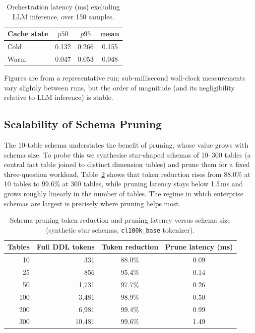 \documentclass[runningheads]{llncs}
\begin{document}
\begin{table}[htbp]
\centering
\caption{Orchestration latency (ms) excluding LLM inference, over 150 samples.}
\label{tab:latency}
\begin{tabular}{lccc}
\toprule
\textbf{Cache state} & \textbf{$p50$} & \textbf{$p95$} & \textbf{mean} \\
\midrule
Cold & 0.132 & 0.266 & 0.155 \\
Warm & 0.047 & 0.053 & 0.048 \\
\bottomrule
\end{tabular}
\par\smallskip
\raggedright\small Figures are from a representative run; sub-millisecond wall-clock measurements vary slightly between runs, but the order of magnitude (and its negligibility relative to LLM inference) is stable.
\end{table}

\subsection{Scalability of Schema Pruning}
\label{sec:scale}
The 10-table schema understates the benefit of pruning, whose value grows with schema size. To probe this we synthesise star-shaped schemas of 10--300 tables (a central fact table joined to distinct dimension tables) and prune them for a fixed three-question workload. Table~\ref{tab:scale} shows that token reduction rises from 88.0\% at 10 tables to 99.6\% at 300 tables, while pruning latency stays below 1.5\,ms and grows roughly linearly in the number of tables. The regime in which enterprise schemas are largest is precisely where pruning helps most.

\begin{table}[htbp]
\centering
\caption{Schema-pruning token reduction and pruning latency versus schema size (synthetic star schemas, \texttt{cl100k\_base} tokenizer).}
\label{tab:scale}
\begin{tabular}{rrcc}
\toprule
\textbf{Tables} & \textbf{Full DDL tokens} & \textbf{Token reduction} & \textbf{Prune latency (ms)} \\
\midrule
10  & 331    & 88.0\% & 0.09 \\
25  & 856    & 95.4\% & 0.14 \\
50  & 1{,}731  & 97.7\% & 0.26 \\
100 & 3{,}481  & 98.9\% & 0.50 \\
200 & 6{,}981  & 99.4\% & 0.99 \\
300 & 10{,}481 & 99.6\% & 1.49 \\
\bottomrule
\end{tabular}
\end{table}
\end{document}
